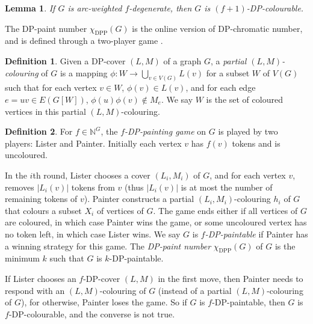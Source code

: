 \documentclass[11pt,a4paper]{article}
\newtheorem{lem}{Lemma}
\theoremstyle{definition}
\newtheorem{definition}{Definition}
\begin{document}
\begin{lem}
    \label{lem-dpf}
    If $G$ is arc-weighted $f$-degenerate, then $G$ is  $(f+1)$-DP-colourable. 
\end{lem}

The DP-paint number $\chi_{\mathrm{DPP}}(G)$ is the online version of DP-chromatic number, and is defined through a two-player game  \cite{KKLZ2020}.

 \begin{definition}
	\label{def-coloring2}
	Given a DP-cover $(L,M)$ of a graph $G$, a {\em partial $(L,M)$-colouring} of $G$ is a mapping $\phi: W \to \bigcup_{v \in V(G)}L(v)$ for a subset $W$ of $V(G)$ such that for each vertex $v \in W$, $\phi(v) \in L(v)$, and for each edge $e=uv \in E(G[W])$, $\phi(u)\phi(v) \notin  M_e$. We say $W$ is the set of coloured vertices in this partial $(L,M)$-colouring.  
\end{definition}

  
\begin{definition}
    \label{def-dppainting}
	For $f \in \mathbb{N}^G$, the \emph{$f$-DP-painting game} on $G$ is played by two players: Lister and Painter. Initially each vertex $v$ has $f(v)$ tokens and is uncoloured. 
  
  In the $i$th round, Lister chooses a cover $(L_i,M_i)$ of $G$, and  for each vertex $v$,  removes $|L_i(v)|$ tokens from $v$ (thus $|L_i(v)|$ is at most the number of remaining tokens of $v$).   Painter constructs a partial $(L_i, M_i)$-colouring $h_i$ of $G$ that colours a subset $X_i$ of vertices of $G$.  The game ends either if all vertices of $G$ are coloured, in which case Painter wins the game, or some uncoloured vertex has no token left, in which case Lister wins. We say $G$ is \emph{$f$-DP-paintable} if Painter has a winning strategy for this game.  
		The \emph{DP-paint number}	$\chi_{\mathrm{DPP}}(G)$ of $G$ is the minimum $k$ such that $G$ is $k$-DP-paintable.
\end{definition}	

If Lister chooses an $f$-DP-cover $(L,M)$ in the first move, then Painter needs to respond with an $(L,M)$-colouring of $G$ (instead of a partial $(L,M)$-colouring of $G$), for otherwise, Painter loses the game. So if $G$ is $f$-DP-paintable, then $G$ is $f$-DP-colourable, and the converse is not true. 
		
\end{document}
